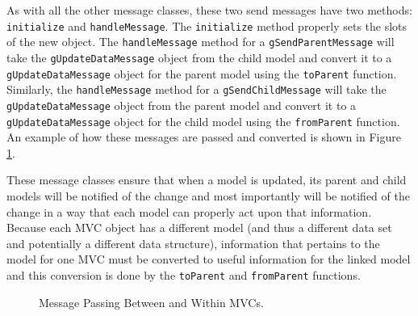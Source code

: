 \documentclass{article}[11pt]
\newcommand{\Rfunction}[1]{{\texttt{#1}}}
\newcommand{\Robject}[1]{{\texttt{#1}}}
\begin{document}
As with all the other message classes, these two send messages have two
methods: \Rfunction{initialize} and \Rfunction{handleMessage}.  The
\Rfunction{initialize} method properly sets the slots of the new object.  The
\Rfunction{handleMessage} method for a \Robject{gSendParentMessage} will
take the \Robject{gUpdateDataMessage} object from the child model and convert
it to a \Robject{gUpdateDataMessage} object for the parent model using the
\Rfunction{toParent} function.  Similarly, the \Rfunction{handleMessage}
method for a \Robject{gSendChildMessage} will take the
\Robject{gUpdateDataMessage} object from the parent model and convert it to a
\Robject{gUpdateDataMessage} object for the child model using the
\Rfunction{fromParent} function.  An example of how these messages are passed
and converted is shown in Figure \ref{Fig:MessPass}.

These message classes ensure that when a model is updated, its parent and
child models will be notified of the change and most importantly will be
notified of the change in a way that each model can properly act upon that
information.  Because each MVC object has a different model (and thus a
different data set and potentially a different data structure), information
that pertains to the model for one MVC must be converted to useful information
for the linked model and this conversion is done by the \Rfunction{toParent}
and \Rfunction{fromParent} functions.  

\begin{figure}[ht]
  \begin{center}
    \caption{ Message Passing Between and Within MVCs. }
    \label{Fig:MessPass}
  \end{center}
\end{figure}
\end{document}
